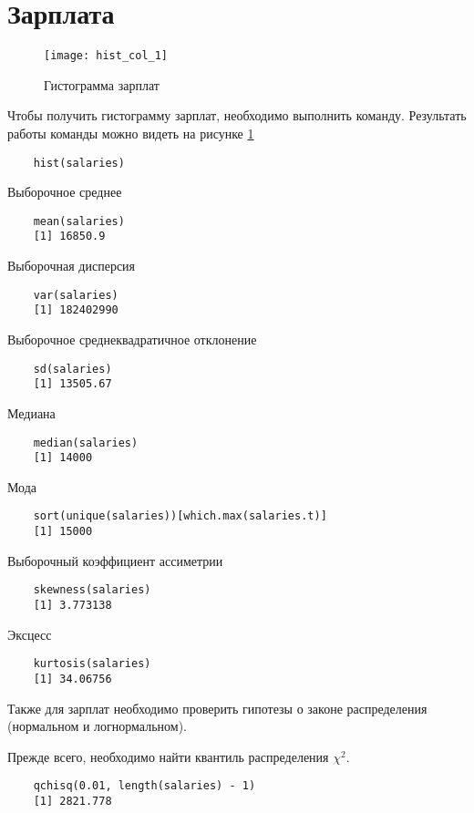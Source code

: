 \documentclass[12pt,a4paper,titlepage]{article}
\begin{document}
\section{Зарплата}
  \begin{figure}
    \texttt{[image: hist\_col\_1]}
    \caption{Гистограмма зарплат}
    \label{salary_hist}
  \end{figure}
  Чтобы получить гистограмму зарплат, необходимо выполнить команду.
  Результать работы команды можно видеть на рисунке \ref{salary_hist}
  \begin{lstlisting}
    hist(salaries)
  \end{lstlisting}


  Выборочное среднее
  \begin{lstlisting}
    mean(salaries)
    [1] 16850.9
  \end{lstlisting}

  Выборочная дисперсия
  \begin{lstlisting}
    var(salaries)
    [1] 182402990
  \end{lstlisting}

  Выборочное среднеквадратичное отклонение
  \begin{lstlisting}
    sd(salaries)
    [1] 13505.67
  \end{lstlisting}

  Медиана
  \begin{lstlisting}
    median(salaries)
    [1] 14000
  \end{lstlisting}

  Мода
  \begin{lstlisting}
    sort(unique(salaries))[which.max(salaries.t)]
    [1] 15000
  \end{lstlisting}

  Выборочный коэффициент ассиметрии
  \begin{lstlisting}
    skewness(salaries)
    [1] 3.773138
  \end{lstlisting}

  Эксцесс
  \begin{lstlisting}
    kurtosis(salaries)
    [1] 34.06756
  \end{lstlisting}

  Также для зарплат необходимо проверить гипотезы о законе распределения (нормальном и логнормальном).

  Прежде всего, необходимо найти квантиль распределения $\chi^2$.
  \begin{lstlisting}
    qchisq(0.01, length(salaries) - 1)
    [1] 2821.778
  \end{lstlisting}
\end{document}
